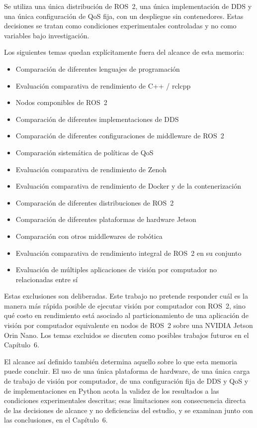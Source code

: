 Se utiliza una única distribución de ROS~2, una única implementación de DDS
y una única configuración de QoS fija, con un despliegue sin contenedores.
Estas decisiones se tratan como condiciones experimentales controladas y no
como variables bajo investigación.

Los siguientes temas quedan explícitamente fuera del alcance de esta memoria:

\begin{itemize}
  \item Comparación de diferentes lenguajes de programación
  \item Evaluación comparativa de rendimiento de C++ / rclcpp
  \item Nodos componibles de ROS~2
  \item Comparación de diferentes implementaciones de DDS
  \item Comparación de diferentes configuraciones de middleware de ROS~2
  \item Comparación sistemática de políticas de QoS
  \item Evaluación comparativa de rendimiento de Zenoh
  \item Evaluación comparativa de rendimiento de Docker y de la
        contenerización
  \item Comparación de diferentes distribuciones de ROS~2
  \item Comparación de diferentes plataformas de hardware Jetson
  \item Comparación con otros middlewares de robótica
  \item Evaluación comparativa de rendimiento integral de ROS~2 en su
        conjunto
  \item Evaluación de múltiples aplicaciones de visión por computador no
        relacionadas entre sí
\end{itemize}

Estas exclusiones son deliberadas. Este trabajo no pretende responder cuál es la
manera más rápida posible de ejecutar visión por computador con ROS~2, sino
qué costo en rendimiento está asociado al particionamiento de una aplicación
de visión por computador equivalente en nodos de ROS~2 sobre una NVIDIA
Jetson Orin Nano. Los temas excluidos se discuten como posibles trabajos
futuros en el Capítulo~6.

El alcance así definido también determina aquello sobre lo que esta memoria
puede concluir. El uso de una única plataforma de hardware, de una única
carga de trabajo de visión por computador, de una configuración fija de DDS y
QoS y de implementaciones en Python acota la validez de los resultados a las
condiciones experimentales descritas; esas limitaciones son consecuencia
directa de las decisiones de alcance y no deficiencias del estudio, y se
examinan junto con las conclusiones, en el Capítulo~6.

